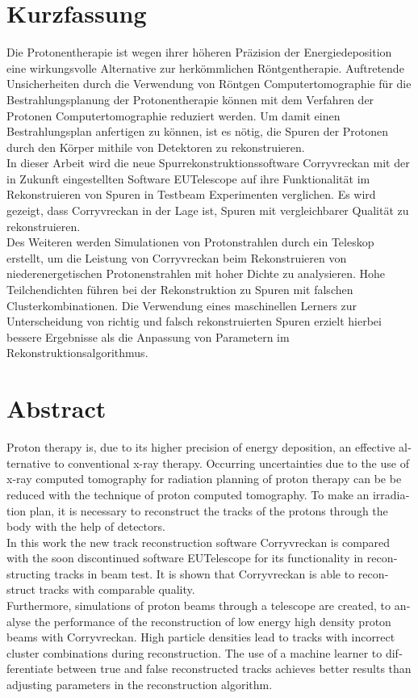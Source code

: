 \thispagestyle{plain}

\section*{Kurzfassung}
Die Protonentherapie ist wegen ihrer höheren Präzision der Energiedeposition eine wirkungsvolle Alternative zur herkömmlichen Röntgentherapie.
Auftretende Unsicherheiten durch die Verwendung von Röntgen Computertomographie für die Bestrahlungsplanung der Protonentherapie können mit dem Verfahren der Protonen Computertomographie reduziert werden.
Um damit einen Bestrahlungsplan anfertigen zu können, ist es nötig, die Spuren der Protonen durch den Körper mithile von Detektoren zu rekonstruieren. \\
In dieser Arbeit wird die neue Spurrekonstruktionssoftware Corryvreckan mit der in Zukunft eingestellten Software EUTelescope auf ihre Funktionalität im
Rekonstruieren von Spuren in Testbeam Experimenten verglichen. Es wird gezeigt, dass Corryvreckan in der Lage ist, Spuren mit vergleichbarer Qualität zu rekonstruieren.\\
Des Weiteren werden Simulationen von Protonstrahlen durch ein Teleskop erstellt, um die Leistung von Corryvreckan beim Rekonstruieren von niederenergetischen
Protonenstrahlen mit hoher Dichte zu analysieren. Hohe Teilchendichten führen bei der Rekonstruktion zu Spuren mit falschen Clusterkombinationen.
Die Verwendung eines maschinellen Lerners zur Unterscheidung von richtig und falsch rekonstruierten Spuren
erzielt hierbei bessere Ergebnisse als die Anpassung von Parametern im \mbox{Rekonstruktionsalgorithmus}.

\section*{Abstract}
\begin{english}
Proton therapy is, due to its higher precision of energy deposition,
an effective alternative to conventional x-ray therapy. Occurring
uncertainties due to the use of x-ray computed tomography for radiation planning of proton therapy can be
be reduced with the technique of proton computed tomography. To
make an irradiation plan, it is necessary to reconstruct the tracks of the protons
through the body with the help of detectors. \\
In this work the new track reconstruction software Corryvreckan is compared with the soon discontinued
software EUTelescope for its functionality in reconstructing tracks in beam test.
It is shown that
Corryvreckan is able to reconstruct tracks with comparable quality. \\
Furthermore, simulations of proton beams through a telescope are created,
to analyse the performance of the reconstruction of low energy high density proton beams with Corryvreckan.
High particle densities lead to tracks with incorrect cluster combinations during reconstruction.
The use of a machine learner
to differentiate between true and false reconstructed tracks achieves better results than adjusting parameters in the reconstruction algorithm.


\end{english}
